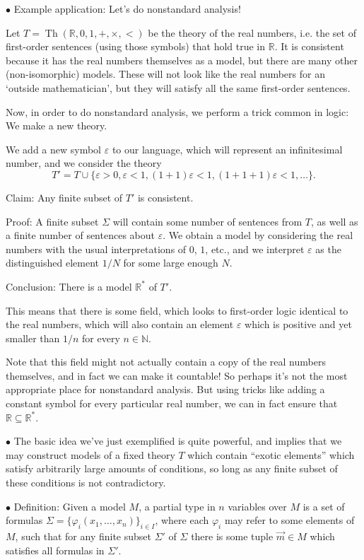\documentclass{article}
\newcommand{\N}{\mathbb{N}}
\newcommand{\R}{\mathbb{R}}
\DeclareMathOperator{\Th}{Th}
\newcommand\Point[1]{\noindent \hspace{\labelsep} {\large $\bullet$ #1} \smallskip}
\begin{document}
\Point{Example application: Let's do nonstandard analysis!

Let $T = \Th(\R, 0, 1, +, \times, <)$ be the theory of the real numbers, i.e. the set of first-order sentences (using those symbols) that hold true in $\R$. It is consistent because it has the real numbers themselves as a model, but there are many other (non-isomorphic) models. These will not look like the real numbers for an `outside mathematician', but they will satisfy all the same first-order sentences.

Now, in order to do nonstandard analysis, we perform a trick common in logic: We make a new theory.

We add a new symbol $\varepsilon$ to our language, which will represent an infinitesimal number, and we consider the theory
\begin{equation}
T' = T \cup \{\varepsilon > 0, \varepsilon < 1, (1+1) \varepsilon < 1, (1+1+1) \varepsilon < 1, \dots \}.
\end{equation}

Claim: Any finite subset of $T'$ is consistent.

Proof: A finite subset $\Sigma$ will contain some number of sentences from $T$, as well as a finite number of sentences about $\varepsilon$. We obtain a model by considering the real numbers with the usual interpretations of $0$, $1$, etc., and we interpret $\varepsilon$ as the distinguished element $1/N$ for some large enough $N$.

Conclusion: There is a model $\R^*$ of $T'$.

This means that there is some field, which looks to first-order logic identical to the real numbers, which will also contain an element $\varepsilon$ which is positive and yet smaller than $1/n$ for every $n \in \N$.

Note that this field might not actually contain a copy of the real numbers themselves, and in fact we can make it countable! So perhaps it's not the most appropriate place for nonstandard analysis. But using tricks like adding a constant symbol for every particular real number, we can in fact ensure that $\R \subseteq \R^*$.}

\Point{The basic idea we've just exemplified is quite powerful, and implies that we may construct models of a fixed theory $T$ which contain ``exotic elements'' which satisfy arbitrarily large amounts of conditions, so long as any finite subset of these conditions is not contradictory.}

\Point{Definition: Given a model $M$, a partial type in $n$ variables over $M$ is a set of formulas $\Sigma = \{\varphi_i(x_1, \dots, x_n)\}_{i \in I}$, where each $\varphi_i$ may refer to some elements of $M$, such that for any finite subset $\Sigma'$ of $\Sigma$ there is some tuple $\vec m \in M$ which satisfies all formulas in $\Sigma'$.}
\end{document}

